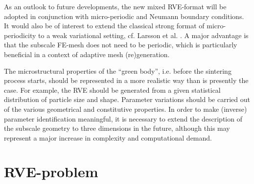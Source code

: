 \documentclass[12pt,review]{elsarticle}
\renewcommand{\ta}[1]{\mathbfit{#1}}
\renewcommand{\ts}[1]{\mathbfit{#1}}
\begin{document}
As an outlook to future developments, the new mixed RVE-format will be adopted in conjunction with micro-periodic and Neumann boundary conditions.
It would also be of interest to extend the classical strong format of micro-periodicity to a weak variational setting, cf. Larsson et al. \cite{Larsson_etal2011}.
A major advantage is that the subscale FE-mesh does not need to be periodic, which is particularly beneficial in a context of adaptive mesh (re)generation.

The microstructural properties of the ``green body'', i.e. before the sintering process starts, should be represented in a more realistic way than is presently the case.
For example, the RVE should be generated from a given statistical distribution of particle size and shape.
Parameter variations should be carried out of the various geometrical and constitutive properties.
In order to make (inverse) parameter identification meaningful, it is necessary to extend the description of the subscale geometry to three dimensions in the future, although this may represent a major increase in complexity and computational demand.

%
%

\appendix
\section{RVE-problem}
\end{document}
